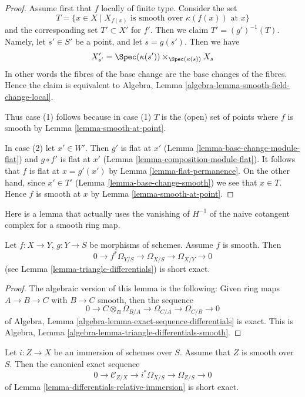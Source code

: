 \begin{proof}
Assume first that $f$ locally of finite type. Consider the set
$$
T = \{x \in X \mid X_{f(x)}\text{ is smooth over }\kappa(f(x))\text{ at }x\}
$$
and the corresponding set $T' \subset X'$ for $f'$. Then we claim
$T' = (g')^{-1}(T)$. Namely, let $s' \in S'$ be a point, and let
$s = g(s')$. Then we have
$$
X'_{s'} =
\Spec(\kappa(s')) \times_{\Spec(\kappa(s))} X_s
$$
In other words the fibres of the base change are the base changes
of the fibres. Hence the claim is equivalent to
Algebra, Lemma \ref{algebra-lemma-smooth-field-change-local}.

\medskip\noindent
Thus case (1) follows because in case (1) $T$ is the (open) set of points
where $f$ is smooth by Lemma \ref{lemma-smooth-at-point}.

\medskip\noindent
In case (2) let $x' \in W'$. Then $g'$ is flat at $x'$
(Lemma \ref{lemma-base-change-module-flat}) and
$g \circ f'$ is flat at $x'$ (Lemma \ref{lemma-composition-module-flat}).
It follows that $f$ is flat at $x = g'(x')$
by Lemma \ref{lemma-flat-permanence}. On the other hand, since
$x' \in T'$ (Lemma \ref{lemma-base-change-smooth})
we see that $x \in T$. Hence $f$ is smooth at $x$ by
Lemma \ref{lemma-smooth-at-point}.
\end{proof}

\noindent
Here is a lemma that actually uses the vanishing of $H^{-1}$
of the naive cotangent complex for a smooth ring map.

\begin{lemma}
\label{lemma-triangle-differentials-smooth}
Let $f : X \to Y$, $g : Y \to S$ be morphisms of schemes.
Assume $f$ is smooth. Then
$$
0 \to f^*\Omega_{Y/S} \to \Omega_{X/S} \to \Omega_{X/Y} \to 0
$$
(see Lemma \ref{lemma-triangle-differentials}) is short exact.
\end{lemma}

\begin{proof}
The algebraic version of this lemma is the following:
Given ring maps $A \to B \to C$ with $B \to C$ smooth, then the sequence
$$
0 \to C \otimes_B \Omega_{B/A} \to \Omega_{C/A} \to \Omega_{C/B} \to 0
$$
of
Algebra, Lemma \ref{algebra-lemma-exact-sequence-differentials}
is exact. This is
Algebra, Lemma \ref{algebra-lemma-triangle-differentials-smooth}.
\end{proof}

\begin{lemma}
\label{lemma-differentials-relative-immersion-smooth}
Let $i : Z \to X$ be an immersion of schemes over $S$.
Assume that $Z$ is smooth over $S$. Then the
canonical exact sequence
$$
0 \to \mathcal{C}_{Z/X} \to i^*\Omega_{X/S} \to \Omega_{Z/S} \to 0
$$
of
Lemma \ref{lemma-differentials-relative-immersion}
is short exact.
\end{lemma}

